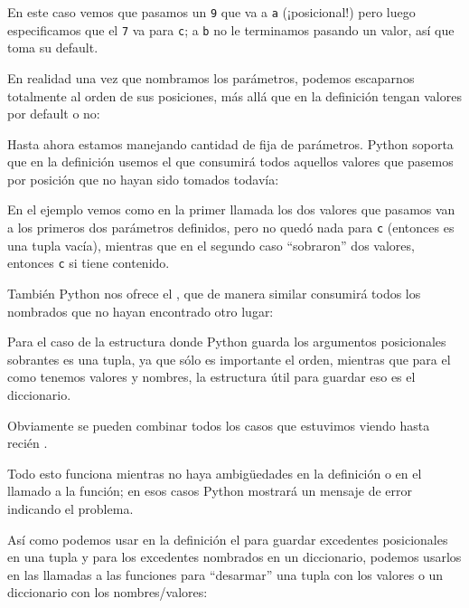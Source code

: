 
En este caso vemos que pasamos un \verb|9| que va a \verb|a| (¡posicional!) pero luego especificamos que el \verb|7| va para \verb|c|; a \verb|b| no le terminamos pasando un valor, así que toma su default.

En realidad una vez que nombramos los parámetros, podemos escaparnos totalmente al orden de sus posiciones, más allá que en la definición tengan valores por default o no:


Hasta ahora estamos manejando cantidad de fija de parámetros. Python soporta que en la definición usemos el \mip{*} que consumirá todos aquellos valores que pasemos por posición que no hayan sido tomados todavía:


En el ejemplo vemos como en la primer llamada los dos valores que pasamos van a los primeros dos parámetros definidos, pero no quedó nada para \verb|c| (entonces es una tupla vacía), mientras que en el segundo caso ``sobraron'' dos valores, entonces \verb|c| si tiene contenido.

También Python nos ofrece el \mip{**}, que de manera similar consumirá todos los nombrados que no hayan encontrado otro lugar:


Para el caso de \mip{*} la estructura donde Python guarda los argumentos posicionales sobrantes es una tupla, ya que sólo es importante el orden, mientras que para el \mip{**} como tenemos valores y nombres, la estructura útil para guardar eso es el diccionario.

Obviamente se pueden combinar todos los casos que estuvimos viendo hasta recién .


Todo esto funciona mientras no haya ambigüedades en la definición o en el llamado a la función; en esos casos Python mostrará un mensaje de error indicando el problema.


Así como podemos usar en la definición el \mip{*} para guardar excedentes posicionales en una tupla y \mip{**} para los excedentes nombrados en un diccionario, podemos usarlos en las llamadas a las funciones para ``desarmar'' una tupla con los valores o un diccionario con los nombres/valores:

